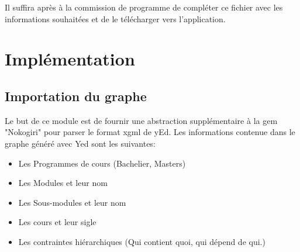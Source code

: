 Il suffira après à la commission de programme de compléter ce fichier avec les informations souhaitées et de le télécharger vers l'application.

\clearpage
\section{Implémentation}
\subsection{Importation du graphe}
Le but de ce module est de fournir une abstraction supplémentaire à la gem "Nokogiri" pour parser le format xgml de yEd. Les informations contenue dans le graphe généré avec Yed sont les suivantes:
\begin{itemize}
\item Les Programmes de cours (Bachelier, Masters)
\item Les Modules et leur nom
\item Les Sous-modules et leur nom
\item Les cours et leur sigle
\item Les contraintes hiérarchiques (Qui contient quoi, qui dépend de qui.)
\end{itemize}

